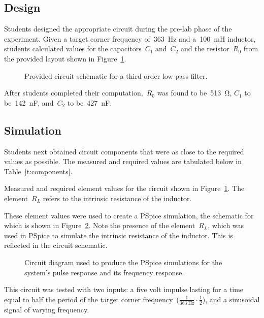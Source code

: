 \subsection{Design}
Students designed the appropriate circuit during the pre-lab phase of the
experiment.  Given a target corner frequency of~\SI{363}{\hertz} and
a~\SI{100}{\milli\henry} inductor, students calculated values for the
capacitors~$C_1$ and~$C_2$ and the resistor~$R_0$ from the provided layout
shown in Figure~\ref{f:prelabSchem}.
%
\begin{figure}[H]
	\centering
	
	\parbox{.6\textwidth}{
	\caption[Prelab Circuit Diagram]{Provided circuit schematic for a third-order low pass filter.}
	\label{f:prelabSchem}}
\end{figure}
%
After students completed their computation,~$R_0$ was found to
be~\SI{513}{\ohm}, $C_1$ to be~\SI{142}{\nano\farad}, and~$C_2$ to
be~\SI{427}{\nano\farad}.

\subsection{Simulation}
Students next obtained circuit components that were as close to the required
values as possible.  The measured and required values are tabulated below in
Table~\ref{t:components}.
%
\begin{table}[H]
	\centering
	
	\parbox{.6\textwidth}{
	\caption[Required and Measured Element Values]{Measured and required
	element values for the circuit shown in Figure~\ref{f:prelabSchem}.  The
	element~$R_L$ refers to the intrinsic resistance of the inductor.}
	\label{t:components}}
\end{table}
%
These element values were used to create a PSpice simulation, the schematic for
which is shown in Figure~\ref{f:pspiceSchem}.  Note the presence of the
element~$R_L$, which was used in PSpice to simulate the intrinsic resistance of
the inductor.  This is reflected in the circuit schematic.
%
\begin{figure}[H]
	\centering
	
	\parbox{.6\textwidth}{
	\caption[PSpice Circuit Diagram]{Circuit diagram used to produce the PSpice
	simulations for the system's pulse response and its frequency response.}
	\label{f:pspiceSchem}}
\end{figure}
%
This circuit was tested with two inputs: a five volt impulse lasting for a time
equal to half the period of the target corner
frequency~($\frac{1}{\SI{363}{\hertz}} \cdot \frac{1}{2}$), and a sinusoidal
signal of varying frequency.

\begin{figure}[H]
	\centering
	
\end{figure}
